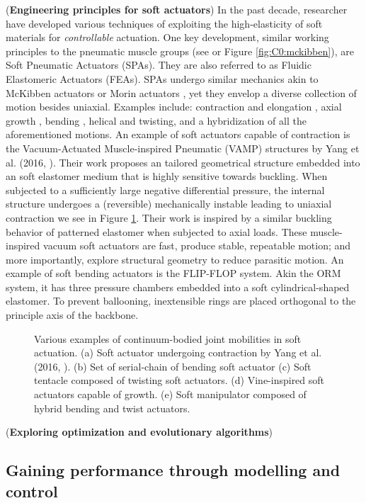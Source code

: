 (\textbf{Engineering principles for soft actuators}) In the past decade, researcher have developed various techniques of exploiting the high-elasticity of soft materials for \textit{controllable} actuation. One key development, similar working principles to the pneumatic muscle groups (see \cite{Mckibben,Morin1953} or Figure \ref{fig:C0:mckibben}), are Soft Pneumatic Actuators (SPAs). They are also referred to as Fluidic Elastomeric Actuators (FEAs). SPAs undergo similar mechanics akin to McKibben actuators \cite{Mckibben} or Morin actuators \cite{Morin1953}, yet they envelop a diverse collection of motion besides uniaxial. Examples include: contraction and elongation \cite{Yang2016}, axial growth \cite{Hawkes2017}, bending \cite{bionic}, helical and twisting, and a hybridization of all the aforementioned motions.
An example of soft actuators capable of contraction is the Vacuum-Actuated Muscle-inspired Pneumatic (VAMP) structures by Yang et al. (2016, \cite{Yang2016}). Their work proposes an tailored geometrical structure embedded into an soft elastomer medium that is highly sensitive towards buckling. When subjected to a sufficiently large negative differential pressure, the internal structure undergoes a (reversible) mechanically instable leading to uniaxial contraction we see in Figure \ref{fig:C0:actuationtypes}. Their work is inspired by a similar buckling behavior of patterned elastomer \cite{Bertoldi2008,Mullin2007,Shim2013Aug} when subjected to axial loads. These muscle-inspired vacuum soft actuators are fast, produce stable, repeatable motion; and more importantly, explore structural geometry to reduce parasitic motion. An example of soft bending actuators is the FLIP-FLOP system.  Akin the ORM system, it has three pressure chambers embedded into a soft cylindrical-shaped elastomer. To prevent ballooning, inextensible rings are placed orthogonal to the principle axis of the backbone.

\begin{figure}[!t]
    \ifx\printFigures\undefined
    \else
    \centering
    \hspace{2mm}
    
    \fi
    \vspace{-3mm}
    \caption{Various examples of continuum-bodied joint mobilities in soft actuation. (a) Soft actuator undergoing contraction by Yang et al. (2016, \cite{Yang2016}). (b) Set of serial-chain of bending soft actuator (c) Soft tentacle composed of twisting soft actuators. (d) Vine-inspired soft actuators capable of growth. (e) Soft manipulator composed of hybrid bending and twist actuators. }
    \label{fig:C0:actuationtypes}
  \end{figure}

(\textbf{Exploring optimization and evolutionary algorithms})

\subsection{Gaining performance through modelling and control}